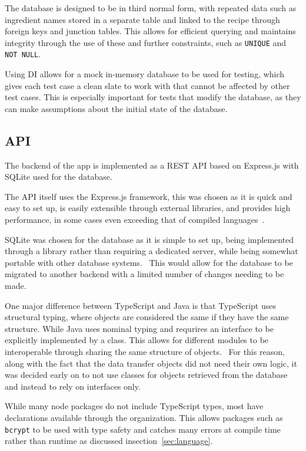 The database is designed to be in third normal form, with repeated data such as ingredient names stored in a separate
table and linked to the recipe through foreign keys and junction tables. This allows for efficient querying and
maintains integrity through the use of these and further constraints, such as \texttt{UNIQUE} and \texttt{NOT NULL}.~\cite{codd_further_1972}

Using DI allows for a mock in-memory database to be used for testing, which gives each test case a clean slate to work with
that cannot be affected by other test cases. This is especially important for tests that modify the database, as they can
make assumptions about the initial state of the database.

\subsection{API}

The backend of the app is implemented as a REST API based on Express.js with SQLite
used for the database.

The API itself uses the Express.js framework, this was chosen as it is quick and easy to set up, is easily extensible
through external libraries, and provides high performance, in some cases even exceeding that of
compiled languages~\cite{karlsson_performance_2021}.

SQLite was chosen for the database as it is simple to set up, being implemented through
a library rather than requiring a dedicated server, while being somewhat portable with other
database systems.~\cite{kreibich_using_2010} This would allow for the database to be migrated to
another backend with a limited number of changes needing to be made.

One major difference between TypeScript and Java is that TypeScript uses structural typing, where objects are considered
the same if they have the same structure. While Java uses nominal typing and requrires an interface to be explicitly
implemented by a class. This allows for different modules to be interoperable through sharing the same structure of objects.~\cite{gil_whiteoak_2008}
For this reason, along with the fact that the data transfer objects did not need their own logic, it was decided early on
to not use classes for objects retrieved from the database and instead to rely on interfaces only.

While many node packages do not include TypeScript types, most have declarations available through the  organization.
This allows packages such as \texttt{bcrypt} to be used with type safety and catches many errors at compile time rather than runtime as discussed
insection~\ref{sec:language}.

